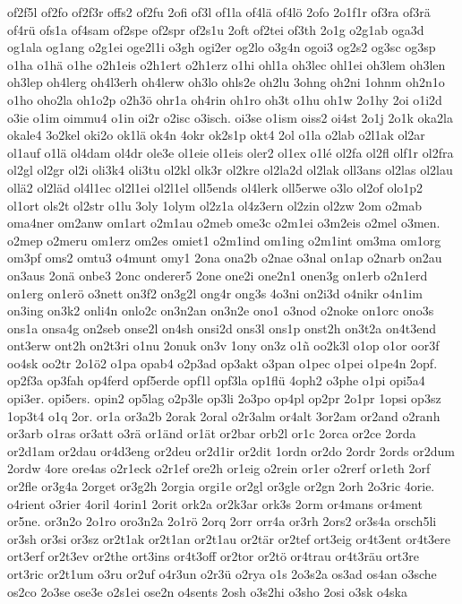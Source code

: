{of2f5l
of2fo
of2f3r
offs2
of2fu
2ofi
of3l
of1la
of4lä
of4lö
2ofo
2o1f1r
of3ra
of3rä
of4rü
ofs1a
of4sam
of2spe
of2spr
of2s1u
2oft
of2tei
of3th
2o1g
o2g1ab
oga3d
og1ala
og1ang
o2g1ei
oge2l1i
o3gh
ogi2er
og2lo
o3g4n
ogoi3
og2s2
og3sc
og3sp
o1ha
o1hä
o1he
o2h1eis
o2h1ert
o2h1erz
o1hi
ohl1a
oh3lec
ohl1ei
oh3lem
oh3len
oh3lep
oh4lerg
oh4l3erh
oh4lerw
oh3lo
ohls2e
oh2lu
3ohng
oh2ni
1ohnm
oh2n1o
o1ho
oho2la
oh1o2p
o2h3ö
ohr1a
oh4rin
oh1ro
oh3t
o1hu
oh1w
2o1hy
2oi
o1i2d
o3ie
o1im
oimmu4
o1in
oi2r
o2isc
o3isch.
oi3se
o1ism
oiss2
oi4st
2o1j
2o1k
oka2la
okale4
3o2kel
oki2o
ok1lä
ok4n
4okr
ok2s1p
okt4
2ol
o1la
o2lab
o2l1ak
ol2ar
ol1auf
o1lä
ol4dam
ol4dr
ole3e
ol1eie
ol1eis
oler2
ol1ex
o1lé
ol2fa
ol2fl
olf1r
ol2fra
ol2gl
ol2gr
ol2i
oli3k4
oli3tu
ol2kl
olk3r
ol2kre
ol2la2d
ol2lak
oll3ans
ol2las
ol2lau
ollä2
ol2läd
ol4l1ec
ol2l1ei
ol2l1el
oll5ends
ol4lerk
oll5erwe
o3lo
ol2of
olo1p2
ol1ort
ols2t
ol2str
o1lu
3oly
1olym
ol2z1a
ol4z3ern
ol2zin
ol2zw
2om
o2mab
oma4ner
om2anw
om1art
o2m1au
o2meb
ome3c
o2m1ei
o3m2eis
o2mel
o3men.
o2mep
o2meru
om1erz
om2es
omiet1
o2m1ind
om1ing
o2m1int
om3ma
om1org
om3pf
oms2
omtu3
o4munt
omy1
2ona
ona2b
o2nae
o3nal
on1ap
o2narb
on2au
on3aus
2onä
onbe3
2onc
onderer5
2one
one2i
one2n1
onen3g
on1erb
o2n1erd
on1erg
on1erö
o3nett
on3f2
on3g2l
ong4r
ong3s
4o3ni
on2i3d
o4nikr
o4n1im
on3ing
on3k2
onli4n
onlo2c
on3n2an
on3n2e
ono1
o3nod
o2noke
on1orc
ono3s
ons1a
onsa4g
on2seb
onse2l
on4sh
onsi2d
ons3l
ons1p
onst2h
on3t2a
on4t3end
ont3erw
ont2h
on2t3ri
o1nu
2onuk
on3v
1ony
on3z
o1ñ
oo2k3l
o1op
o1or
oor3f
oo4sk
oo2tr
2o1ö2
o1pa
opab4
o2p3ad
op3akt
o3pan
o1pec
o1pei
o1pe4n
2opf.
op2f3a
op3fah
op4ferd
opf5erde
opf1l
opf3la
op1flü
4oph2
o3phe
o1pi
opi5a4
opi3er.
opi5ers.
opin2
op5lag
o2p3le
op3li
2o3po
op4pl
op2pr
2o1pr
1opsi
op3sz
1op3t4
o1q
2or.
or1a
or3a2b
2orak
2oral
o2r3alm
or4alt
3or2am
or2and
o2ranh
or3arb
o1ras
or3att
o3rä
or1änd
or1ät
or2bar
orb2l
or1c
2orca
or2ce
2orda
or2d1am
or2dau
or4d3eng
or2deu
or2d1ir
or2dit
1ordn
or2do
2ordr
2ords
or2dum
2ordw
4ore
ore4as
o2r1eck
o2r1ef
ore2h
or1eig
o2rein
or1er
o2rerf
or1eth
2orf
or2fle
or3g4a
2orget
or3g2h
2orgia
orgi1e
or2gl
or3gle
or2gn
2orh
2o3ric
4orie.
o4rient
o3rier
4oril
4orin1
2orit
ork2a
or2k3ar
ork3s
2orm
or4mans
or4ment
or5ne.
or3n2o
2o1ro
oro3n2a
2o1rö
2orq
2orr
orr4a
or3rh
2ors2
or3s4a
orsch5li
or3sh
or3si
or3sz
or2t1ak
or2t1an
or2t1au
or2tär
or2tef
ort3eig
or4t3ent
or4t3ere
ort3erf
or2t3ev
or2the
ort3ins
or4t3off
or2tor
or2tö
or4trau
or4t3räu
ort3re
ort3ric
or2t1um
o3ru
or2uf
o4r3un
o2r3ü
o2rya
o1s
2o3s2a
os3ad
os4an
o3sche
os2co
2o3se
ose3e
o2s1ei
ose2n
o4sents
2osh
o3s2hi
o3sho
2osi
o3sk
o4ska
}
